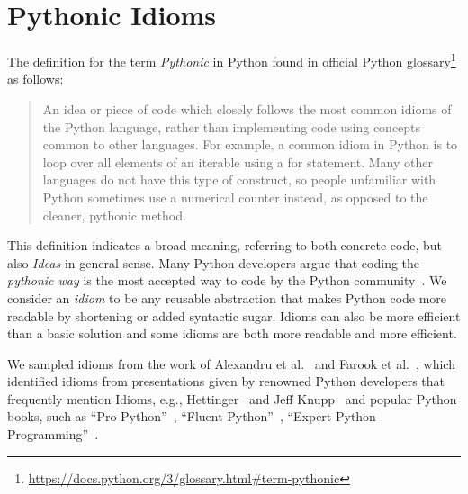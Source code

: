 \section{Pythonic Idioms}
The definition for the term \emph{Pythonic} in Python found in official Python glossary\footnote{\url{https://docs.python.org/3/glossary.html\#term-pythonic}} as follows:

\begin{quote}
    An idea or piece of code which closely follows the most common idioms of the Python language, rather than implementing code using concepts common to other languages. For example, a common idiom in Python is to loop over all elements of an iterable using a for statement. Many other languages do not have this type of construct, so people unfamiliar with Python sometimes use a numerical counter instead, as opposed to the cleaner, pythonic method.
\end{quote}

This definition indicates a broad meaning, referring to both concrete code, but also \emph{Ideas} in general sense. Many Python developers argue that coding the \emph{pythonic way} is the most accepted way to code by the Python community~\cite{Alexandru2018}. We consider an \emph{idiom} to be any reusable abstraction that makes Python code more readable by shortening or added syntactic sugar. Idioms can also be more efficient than a basic solution and some idioms are both more readable and more efficient.

We sampled idioms from the work of Alexandru et al.~\cite{Alexandru2018} and Farook et al.~\cite{idioms}, which identified idioms from presentations given by renowned Python developers that frequently mention Idioms, e.g., Hettinger~\cite{hettinger} and Jeff Knupp~\cite{knupp} and popular Python books, such as ``Pro Python''~\cite{Alchin2010}, ``Fluent Python''~\cite{fluent}, ``Expert Python Programming''~\cite{expert}.


